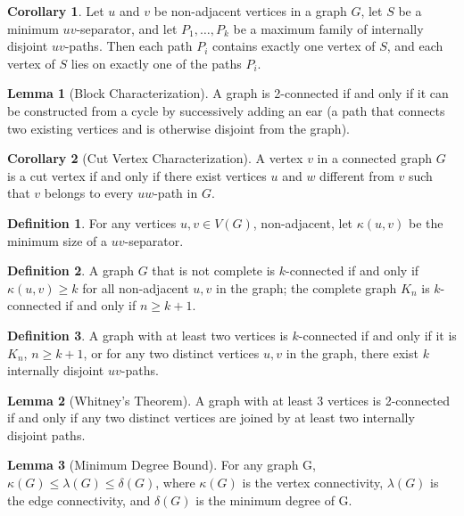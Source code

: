 \documentclass{article}
\theoremstyle{definition}
\newtheorem{lemma}{Lemma}
\newtheorem{corollary}{Corollary}
\newtheorem{definition}{Definition}
\begin{document}
\begin{corollary}
Let $u$ and $v$ be non-adjacent vertices in a graph $G$, let $S$ be a minimum $uv$-separator, and let $P_1, \ldots, P_k$ be a maximum family of internally disjoint $uv$-paths. Then each path $P_i$ contains exactly one vertex of $S$, and each vertex of $S$ lies on exactly one of the paths $P_i$.
\end{corollary}


\begin{lemma}[Block Characterization]
A graph is 2-connected if and only if it can be constructed from a cycle by successively adding an ear (a path that connects two existing vertices and is otherwise disjoint from the graph).
\end{lemma}

\begin{corollary}[Cut Vertex Characterization]
A vertex $v$ in a connected graph $G$ is a cut vertex if and only if there exist vertices $u$ and $w$ different from $v$ such that $v$ belongs to every $uw$-path in $G$.
\end{corollary}

\begin{definition}
For any vertices $u, v \in V(G)$, non-adjacent, let $\kappa(u,v)$ be the minimum size of a $uv$-separator.
\end{definition}


\begin{definition}
A graph $G$ that is not complete is $k$-connected if and only if $\kappa(u,v) \geq k$ for all non-adjacent $u,v$ in the graph; the complete graph $K_n$ is $k$-connected if and only if $n \geq k+1$.
\end{definition}

\begin{definition}
A graph with at least two vertices is $k$-connected if and only if it is $K_n$, $n \geq k+1$, or for any two distinct vertices $u, v$ in the graph, there exist $k$ internally disjoint $uv$-paths.
\end{definition}

\begin{lemma}[Whitney's Theorem]
A graph with at least 3 vertices is 2-connected if and only if any two distinct vertices are joined by at least two internally disjoint paths.
\end{lemma}

\begin{lemma}[Minimum Degree Bound]\label{lem:min-degree-bound}
For any graph G, $\kappa(G) \leq \lambda(G) \leq \delta(G)$, where $\kappa(G)$ is the vertex connectivity, $\lambda(G)$ is the edge connectivity, and $\delta(G)$ is the minimum degree of G.
\end{lemma}
\end{document}
